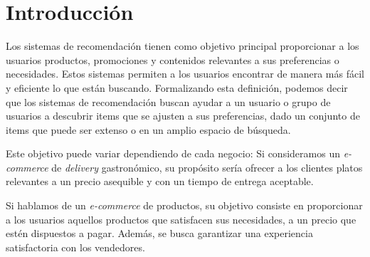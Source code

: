\documentclass[11pt,a4paper,twoside]{thesis}
\begin{document}

\def\autor{Adrian Norberto Marino}
\def\tituloTesis{Sistemas de Recomendación Colaborativos}
\def\runtitulo{Resumen}
\def\runtitle{Sistemas de Recomendación Colaborativos}


\def\lugar{Buenos Aires, 2022}


%
\frontmatter
\pagestyle{empty}

%
%
\cleardoublepage
%
%
%
\tableofcontents
%
%
\mainmatter
\pagestyle{headings}
%
%
%
%


\chapter{Introducción}

Los sistemas de recomendación tienen como objetivo principal proporcionar a los
usuarios productos, promociones y contenidos relevantes a sus preferencias o
necesidades. Estos sistemas permiten a los usuarios encontrar de manera más
fácil y eficiente lo que están buscando. Formalizando esta definición, podemos
decir que los sistemas de recomendación buscan ayudar a un usuario o grupo de
usuarios a descubrir items que se ajusten a sus preferencias, dado un conjunto
de items que puede ser extenso o en un amplio espacio de búsqueda.

Este objetivo puede variar dependiendo de cada negocio: Si consideramos un
\textit{e-commerce} de \textit{delivery} gastronómico, su propósito sería
ofrecer a los clientes platos relevantes a un precio asequible y con un tiempo
de entrega aceptable.

Si hablamos de un \textit{e-commerce} de productos, su objetivo consiste en
proporcionar a los usuarios aquellos productos que satisfacen sus necesidades,
a un precio que estén dispuestos a pagar. Además, se busca garantizar una
experiencia satisfactoria con los vendedores.
\end{document}
